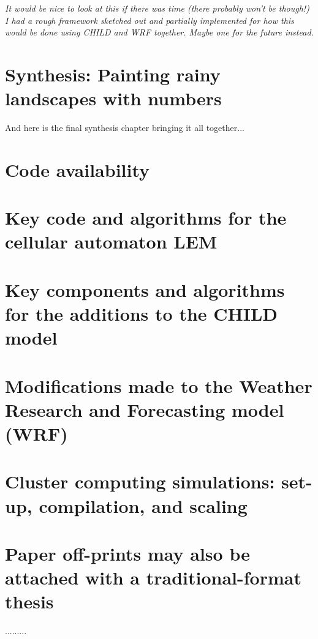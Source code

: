 \documentclass[12pt,oneside,PhD]{muthesis}
\begin{document}
\textit{It would be nice to look at this if there was time (there probably won't be though!) I had a rough framework sketched out and partially implemented for how this would be done using CHILD and WRF together. Maybe one for the future instead.
}
\chapter{Synthesis: Painting rainy landscapes with numbers}

And here is the final synthesis chapter bringing it all together...




\appendix
\chapter{Code availability}

\chapter{Key code and algorithms for the cellular automaton LEM}

\chapter{Key components and algorithms for the additions to the CHILD model}

\chapter{Modifications made to the Weather Research and Forecasting model (WRF)}


\chapter{Cluster computing simulations: set-up, compilation, and scaling}

\chapter{Paper off-prints may also be attached with a traditional-format thesis}
.........

\end{document}
